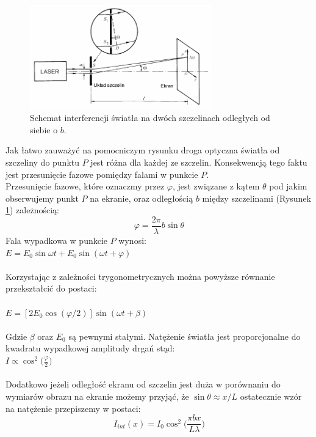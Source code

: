 \documentclass{article}
\begin{document}
\begin{figure}[h!]
	\centering
	\includegraphics[width=0.7\textwidth]{images/interferencja.png}
	\caption{Schemat interferencji światła na dwóch szczelinach odległych od siebie o $b$.\cite{1}}
	\label{schemat_interferencja}
\end{figure}
Jak łatwo zauważyć na pomocniczym rysunku droga optyczna światła od szczeliny do punktu $P$ jest różna dla każdej ze szczelin. Konsekwencją tego faktu jest przesunięcie fazowe pomiędzy falami w punkcie $P$. \\
Przesunięcie fazowe, które oznaczmy przez $\varphi$, jest związane z kątem $\theta$ pod jakim obserwujemy punkt $P$ na ekranie, oraz odległością $b$ między szczelinami (Rysunek \ref{schemat_interferencja}) zależnością\cite{1}:
\begin{equation}
\varphi = \frac{2\pi}{\lambda}b \sin \theta
\label{wz_fi}
\end{equation}
Fala wypadkowa w punkcie $P$ wynosi:\\
$E=E_0\sin \omega t +E_0\sin (\omega t + \varphi)$\\\\
Korzystając z zależności trygonometrycznych można powyższe równanie przekształcić do postaci\cite{1}:\\\\
$E=[2E_0\cos (\varphi/2)]\sin(\omega t + \beta)$\\\\
Gdzie $\beta$ oraz $E_0$ są pewnymi stałymi. Natężenie światła jest proporcjonalne do kwadratu wypadkowej amplitudy drgań stąd:\\
$I\propto \cos ^2 \Big(\frac{\varphi}{2}\Big)$\\\\
Dodatkowo jeżeli odległość ekranu od szczelin jest duża w porównaniu do wymiarów obrazu na ekranie możemy przyjąć, że $\sin\theta \approx x/L$ ostatecznie wzór na natężenie przepiszemy w postaci:\\
\begin{equation}
I_{int}(x) = I_0\cos ^2 \Big(\frac{\pi bx}{L\lambda}\Big)
\label{wz_natezenie_interferencja}
\end{equation}
\end{document}
